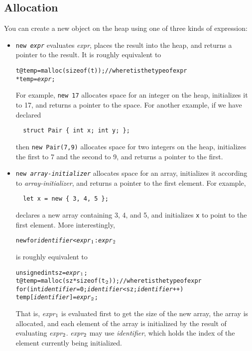\subsection{Allocation}
You can create a new object on the heap using one of three kinds of
expression: 
\begin{itemize}
\item \texttt{new {\it expr}} evaluates \textit{expr}, places the
  result into the heap, and returns a pointer to the result.  It is
  roughly equivalent to
\begin{alltt}
  t @ temp = malloc(sizeof(t)); // where t is the type of expr
  *temp = {\it expr};
\end{alltt}
  For example, \texttt{new 17} allocates space for an integer on the
  heap, initializes it to 17, and returns a pointer to the space.  For
  another example, if we have declared
\begin{verbatim}
  struct Pair { int x; int y; };
\end{verbatim}
  then \texttt{new Pair(7,9)} allocates space for two integers on the
  heap, initializes the first to 7 and the second to 9, and returns a
  pointer to the first.

\item \texttt{new {\it array-initializer}} allocates space for an
  array, initializes it according to \textit{array-initializer}, and
  returns a pointer to the first element.  For example,
\begin{verbatim}
  let x = new { 3, 4, 5 };
\end{verbatim}
  declares a new array containing 3, 4, and 5, and initializes
  \texttt{x} to point to the first element.  More interestingly,
\begin{alltt}
  new \lb for {\it identifier} < {\it expr}\(\sb{1}\) : {\it expr}\(\sb{2}\) \rb
\end{alltt}
  is roughly equivalent to
\begin{alltt}
  unsigned int sz = {\it expr}\(\sb{1}\);
  t @ temp = malloc(sz * sizeof(t\(\sb{2}\))); // where t is the  type of expr
  for (int {\it identifier} = 0; {\it identifier} < sz; {\it identifier}++)
    temp[{\it identifier}] = {\it expr}\(\sb{2}\);
\end{alltt}
  That is, 
  {\it expr}\(\sb{1}\)
  is evaluated first to get the size of the new array,
  the array is allocated, and each element of the array is
  initialized by the result of evaluating
  {\it expr}\(\sb{2}\).
  {\it expr}\(\sb{2}\) may use {\it identifier}, which 
  holds the index of the element currently being initialized.
  

\end{itemize}
